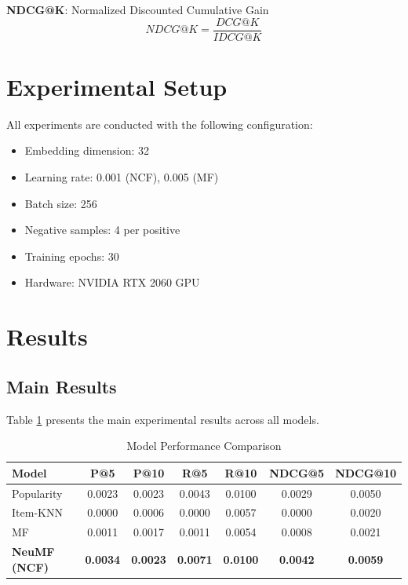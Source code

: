 \textbf{NDCG@K}: Normalized Discounted Cumulative Gain
\begin{equation}
    NDCG@K = \frac{DCG@K}{IDCG@K}
\end{equation}

\section{Experimental Setup}

All experiments are conducted with the following configuration:
\begin{itemize}
    \item Embedding dimension: 32
    \item Learning rate: 0.001 (NCF), 0.005 (MF)
    \item Batch size: 256
    \item Negative samples: 4 per positive
    \item Training epochs: 30
    \item Hardware: NVIDIA RTX 2060 GPU
\end{itemize}

\section{Results}

\subsection{Main Results}

Table \ref{tab:results} presents the main experimental results across all models.

\begin{table}[H]
\centering
\caption{Model Performance Comparison}
\label{tab:results}
\begin{tabular}{lcccccc}
\hline
\textbf{Model} & \textbf{P@5} & \textbf{P@10} & \textbf{R@5} & \textbf{R@10} & \textbf{NDCG@5} & \textbf{NDCG@10} \\
\hline
Popularity & 0.0023 & 0.0023 & 0.0043 & 0.0100 & 0.0029 & 0.0050 \\
Item-KNN & 0.0000 & 0.0006 & 0.0000 & 0.0057 & 0.0000 & 0.0020 \\
MF & 0.0011 & 0.0017 & 0.0011 & 0.0054 & 0.0008 & 0.0021 \\
\textbf{NeuMF (NCF)} & \textbf{0.0034} & \textbf{0.0023} & \textbf{0.0071} & \textbf{0.0100} & \textbf{0.0042} & \textbf{0.0059} \\
\hline
\end{tabular}
\end{table}

